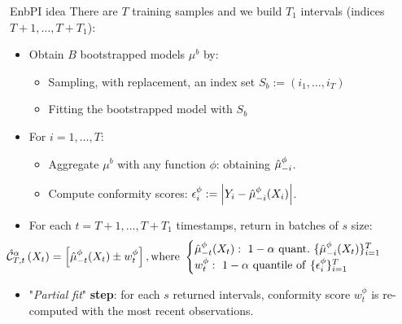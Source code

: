 \documentclass{beamer}
\renewcommand{\a}{\alpha}
\begin{document}
\begin{frame}{EnbPI idea}
    There are $T$ training samples and we build $T_1$ intervals (indices $T+1, \ldots, T+T_1$):
    \begin{itemize}%
        \item Obtain $B$ bootstrapped models $\mu^b$ by:
        \begin{itemize}%
            \item Sampling, with replacement, an index set $S_b:=\left(i_1,\ldots, i_T\right)$ %
            \item Fitting the bootstrapped model with $S_b$ %
        \end{itemize}
        \item For $i=1, \ldots, T$:  %
        \begin{itemize}%
            \item Aggregate $\mu^b$ with any function $\phi$: obtaining $\Hat{\mu}^\phi_{-i}$. 
            \item Compute conformity scores: $\epsilon_i^{\phi}:=\left|Y_i-\Hat{\mu}^\phi_{-i}(X_i)\right|$.
        \end{itemize}
        \item For each $t=T+1,\ldots, T+T_1$ timestamps, return in batches of $s$ size: $$
        \hspace{-15mm}
        \Hat{\mathcal{C}}_{T, t}^{\alpha}\left(X_t\right) = %
        \left[\Hat{\mu}^\phi_{-t}(X_t) \pm w_t^\phi\right], \mathrm{where}\ 
        \begin{cases}
            \Hat{\mu}^\phi_{-t}(X_t):\ 1-\a\ \mathrm{quant.}\ \{\Hat{\mu}^\phi_{-i}(X_t)\}_{i=1}^T\\
            w_t^\phi:\ 1-\a\ \mathrm{quantile}\ \mathrm{of}\ \{\epsilon^\phi_{i}\}_{i=1}^T
        \end{cases}
        $$
        \item "\textit{Partial fit}" \textbf{step}: for each $s$ returned intervals, conformity score $w^\phi_t$ is re-computed with the most recent observations. 
    \end{itemize}
    
\end{frame}
\end{document}
